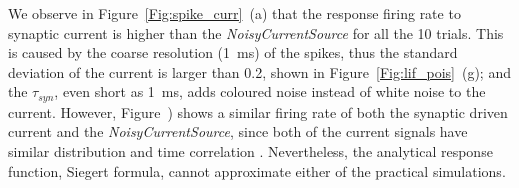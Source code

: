 	We observe in Figure~\ref{Fig:spike_curr}~(a) that the response firing rate to synaptic current is higher than the \textit{NoisyCurrentSource} for all the 10 trials.
	This is caused by the coarse resolution (1~ms) of the spikes, thus the standard deviation of the current is larger than 0.2, shown in Figure~\ref{Fig:lif_pois}~(g);
	and the $\tau_{syn}$, even \DIFaddbegin {}\DIFaddend short as 1~ms, adds coloured noise instead of white noise to the current.
	However, Figure~\DIFdelbegin {}\DIFdelend \DIFaddbegin {}\DIFaddend ) shows a similar firing rate of both the synaptic driven current and the \textit{NoisyCurrentSource}, since both of the current signals have similar distribution \DIFaddbegin {}\DIFaddend and time correlation \DIFaddbegin {}\DIFaddend .
	Nevertheless, the analytical response function, \DIFaddbegin {}\DIFaddend Siegert formula, cannot approximate either of the practical simulations.

